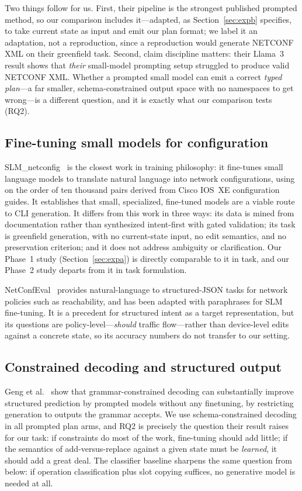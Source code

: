 \documentclass[conference]{IEEEtran}
\begin{document}
Two things follow for us. First, their pipeline is the strongest published prompted method, so our comparison includes it---adapted, as Section~\ref{sec:expb} specifies, to take current state as input and emit our plan format; we label it an adaptation, not a reproduction, since a reproduction would generate NETCONF XML on their greenfield task. Second, claim discipline matters: their Llama~3 result shows that \emph{their} small-model prompting setup struggled to produce valid NETCONF XML. Whether a prompted small model can emit a correct \emph{typed plan}---a far smaller, schema-constrained output space with no namespaces to get wrong---is a different question, and it is exactly what our comparison tests (RQ2).

\subsection{Fine-tuning small models for configuration}

SLM\_netconfig~\cite{slmnetconfig2025} is the closest work in training philosophy: it fine-tunes small language models to translate natural language into network configurations, using on the order of ten thousand pairs derived from Cisco IOS~XE configuration guides. It establishes that small, specialized, fine-tuned models are a viable route to CLI generation. It differs from this work in three ways: its data is mined from documentation rather than synthesized intent-first with gated validation; its task is greenfield generation, with no current-state input, no edit semantics, and no preservation criterion; and it does not address ambiguity or clarification. Our Phase~1 study (Section~\ref{sec:expa}) is directly comparable to it in task, and our Phase~2 study departs from it in task formulation.

NetConfEval~\cite{netconfeval} provides natural-language to structured-JSON tasks for network policies such as reachability, and has been adapted with paraphrases for SLM fine-tuning. It is a precedent for structured intent as a target representation, but its questions are policy-level---\emph{should} traffic flow---rather than device-level edits against a concrete state, so its accuracy numbers do not transfer to our setting.

\subsection{Constrained decoding and structured output}

Geng et al.~\cite{geng2023grammar} show that grammar-constrained decoding can substantially improve structured prediction by prompted models without any finetuning, by restricting generation to outputs the grammar accepts. We use schema-constrained decoding in all prompted plan arms, and RQ2 is precisely the question their result raises for our task: if constraints do most of the work, fine-tuning should add little; if the semantics of add-versus-replace against a given state must be \emph{learned}, it should add a great deal. The classifier baseline sharpens the same question from below: if operation classification plus slot copying suffices, no generative model is needed at all.
\end{document}

